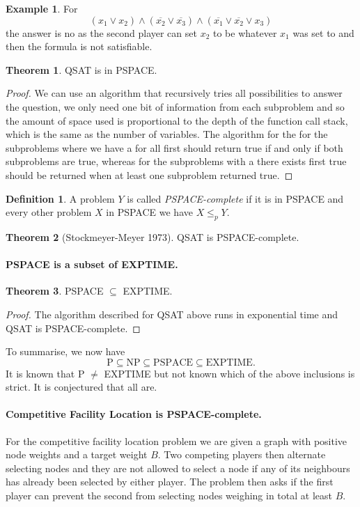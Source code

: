 \documentclass[11pt,a4paper]{article}
\theoremstyle{definition}
\newtheorem{thm}{Theorem}
\newtheorem{defn}{Definition}
\newtheorem*{ex}{Example}
\begin{document}
\begin{ex}
For
\[
(x_1 \vee x_2)\wedge(\overline{x_2} \vee\overline{x_3}) \wedge (\overline{x_1} \vee \overline{x_2} \vee x_3)
\]
the answer is no as the second player can set $x_2$ to be whatever $x_1$ was set to and then the formula is not satisfiable.
\end{ex}

\begin{thm}
QSAT is in PSPACE.
\end{thm}
\begin{proof}
We can use an algorithm that recursively tries all possibilities to answer the question, we only need one bit of information from each subproblem and so the amount of space used is proportional to the depth of the function call stack, which is the same as the number of variables.
The algorithm for the for the subproblems where we have a for all first should return true if and only if both subproblems are true, whereas for the subproblems with a there exists first true should be returned when at least one subproblem returned true.
\end{proof}

\begin{defn}
A problem $Y$ is called \emph{PSPACE-complete} if it is in PSPACE and every other problem $X$ in PSPACE we have $X \le_p Y$.
\end{defn}

\begin{thm}[Stockmeyer-Meyer 1973]
QSAT is PSPACE-complete.
\end{thm}

\paragraph{PSPACE is a subset of EXPTIME.}
\begin{thm}
PSPACE $\subseteq$ EXPTIME.
\end{thm}
\begin{proof}
The algorithm described for QSAT above runs in exponential time and QSAT is PSPACE-complete.
\end{proof}

To summarise, we now have
\[
\text{P} \subseteq\text{NP} \subseteq\text{PSPACE} \subseteq\text{EXPTIME}.
\]
It is known that P $\ne$ EXPTIME but not known which of the above inclusions is strict.
It is conjectured that all are.

\paragraph{Competitive Facility Location is PSPACE-complete.}
For the competitive facility location problem we are given a graph with positive node weights and a target weight $B$.
Two competing players then alternate selecting nodes and they are not allowed to select a node if any of its neighbours has already been selected by either player.
The problem then asks if the first player can prevent the second from selecting nodes weighing in total at least $B$.
\end{document}
